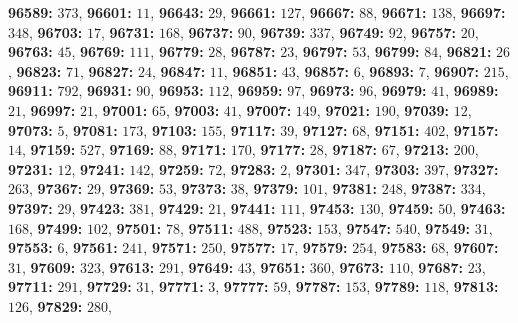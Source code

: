 \textsf{\bfseries 96589:} $373$, \textsf{\bfseries 96601:} $11$, \textsf{\bfseries 96643:} $29$, \textsf{\bfseries 96661:} $127$, \textsf{\bfseries 96667:} $88$, \textsf{\bfseries 96671:} $138$, \textsf{\bfseries 96697:} $348$, \textsf{\bfseries 96703:} $17$, \textsf{\bfseries 96731:} $168$, \textsf{\bfseries 96737:} $90$, \textsf{\bfseries 96739:} $337$, \textsf{\bfseries 96749:} $92$, \textsf{\bfseries 96757:} $20$, \textsf{\bfseries 96763:} $45$, \textsf{\bfseries 96769:} $111$, \textsf{\bfseries 96779:} $28$, \textsf{\bfseries 96787:} $23$, \textsf{\bfseries 96797:} $53$, \textsf{\bfseries 96799:} $84$, \textsf{\bfseries 96821:} $26$, \textsf{\bfseries 96823:} $71$, \textsf{\bfseries 96827:} $24$, \textsf{\bfseries 96847:} $11$, \textsf{\bfseries 96851:} $43$, \textsf{\bfseries 96857:} $6$, \textsf{\bfseries 96893:} $7$, \textsf{\bfseries 96907:} $215$, \textsf{\bfseries 96911:} $792$, \textsf{\bfseries 96931:} $90$, \textsf{\bfseries 96953:} $112$, \textsf{\bfseries 96959:} $97$, \textsf{\bfseries 96973:} $96$, \textsf{\bfseries 96979:} $41$, \textsf{\bfseries 96989:} $21$, \textsf{\bfseries 96997:} $21$, \textsf{\bfseries 97001:} $65$, \textsf{\bfseries 97003:} $41$, \textsf{\bfseries 97007:} $149$, \textsf{\bfseries 97021:} $190$, \textsf{\bfseries 97039:} $12$, \textsf{\bfseries 97073:} $5$, \textsf{\bfseries 97081:} $173$, \textsf{\bfseries 97103:} $155$, \textsf{\bfseries 97117:} $39$, \textsf{\bfseries 97127:} $68$, \textsf{\bfseries 97151:} $402$, \textsf{\bfseries 97157:} $14$, \textsf{\bfseries 97159:} $527$, \textsf{\bfseries 97169:} $88$, \textsf{\bfseries 97171:} $170$, \textsf{\bfseries 97177:} $28$, \textsf{\bfseries 97187:} $67$, \textsf{\bfseries 97213:} $200$, \textsf{\bfseries 97231:} $12$, \textsf{\bfseries 97241:} $142$, \textsf{\bfseries 97259:} $72$, \textsf{\bfseries 97283:} $2$, \textsf{\bfseries 97301:} $347$, \textsf{\bfseries 97303:} $397$, \textsf{\bfseries 97327:} $263$, \textsf{\bfseries 97367:} $29$, \textsf{\bfseries 97369:} $53$, \textsf{\bfseries 97373:} $38$, \textsf{\bfseries 97379:} $101$, \textsf{\bfseries 97381:} $248$, \textsf{\bfseries 97387:} $334$, \textsf{\bfseries 97397:} $29$, \textsf{\bfseries 97423:} $381$, \textsf{\bfseries 97429:} $21$, \textsf{\bfseries 97441:} $111$, \textsf{\bfseries 97453:} $130$, \textsf{\bfseries 97459:} $50$, \textsf{\bfseries 97463:} $168$, \textsf{\bfseries 97499:} $102$, \textsf{\bfseries 97501:} $78$, \textsf{\bfseries 97511:} $488$, \textsf{\bfseries 97523:} $153$, \textsf{\bfseries 97547:} $540$, \textsf{\bfseries 97549:} $31$, \textsf{\bfseries 97553:} $6$, \textsf{\bfseries 97561:} $241$, \textsf{\bfseries 97571:} $250$, \textsf{\bfseries 97577:} $17$, \textsf{\bfseries 97579:} $254$, \textsf{\bfseries 97583:} $68$, \textsf{\bfseries 97607:} $31$, \textsf{\bfseries 97609:} $323$, \textsf{\bfseries 97613:} $291$, \textsf{\bfseries 97649:} $43$, \textsf{\bfseries 97651:} $360$, \textsf{\bfseries 97673:} $110$, \textsf{\bfseries 97687:} $23$, \textsf{\bfseries 97711:} $291$, \textsf{\bfseries 97729:} $31$, \textsf{\bfseries 97771:} $3$, \textsf{\bfseries 97777:} $59$, \textsf{\bfseries 97787:} $153$, \textsf{\bfseries 97789:} $118$, \textsf{\bfseries 97813:} $126$, \textsf{\bfseries 97829:} $280$, 
